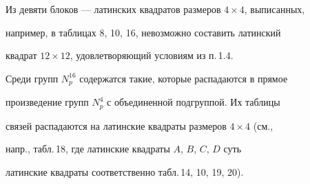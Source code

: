 \smallskip





\noindent{}Из девяти блоков --- латинских квадратов размеров $4\times 4$, выписанных, 


например, в таблицах 8, 10, 16, невозможно составить латинский


квадрат $12\times 12$, удовлетворяющий условиям из п.\,1.4.





Среди групп $N^{16}_p$ содержатся такие, которые распадаются в прямое 


произведение групп $N^4_p$ с объединенной подгруппой. Их таблицы


связей распадаются на латинские квадраты размеров $4\times 4$ (см.,


напр., табл.\,18, где латинские квадраты $A$, $B$, $C$, $D$ суть


латинские квадраты соответственно табл.\,14, 10, 19, 20).


\smallskip


